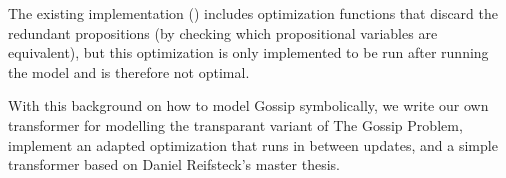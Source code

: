 The existing implementation (\cite{GattingerThesis2018}) includes optimization functions that discard the redundant propositions 
(by checking which propositional variables are equivalent), but this optimization is only implemented to be run after running the 
model and is therefore not optimal. 

With this background on how to model Gossip symbolically, we write our own transformer for modelling the transparant variant 
of The Gossip Problem, implement an adapted optimization that runs in between updates, and a simple transformer based on Daniel 
Reifsteck's master thesis. 


